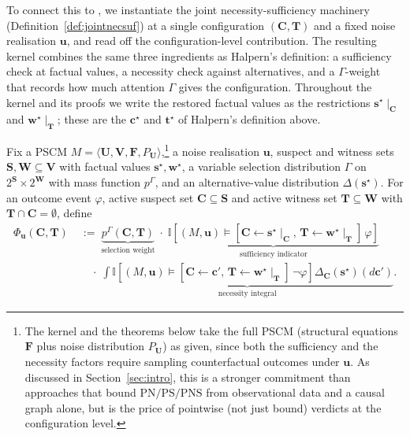 \noindent To connect this to \ourapproach{}, we instantiate the joint
necessity-sufficiency machinery (Definition~\ref{def:jointnecsuf}) at a single
configuration $(\mathbf{C}, \mathbf{T})$ and a fixed noise realisation $\mathbf{u}$,
and read off the configuration-level contribution. The resulting kernel combines the
same three ingredients as Halpern's definition: a sufficiency check at factual values,
a necessity check against alternatives, and a $\Gamma$-weight that records how much
attention $\Gamma$ gives the configuration. Throughout the kernel and its proofs we write
the restored factual values as the restrictions $\mathbf{s}^\star\!\mid_{\mathbf{C}}$
and $\mathbf{w}^\star\!\mid_{\mathbf{T}}$; these are the $\mathbf{c}^\star$ and
$\mathbf{t}^\star$ of Halpern's definition above.

\begin{definition} \label{def:ackernel}
Fix a PSCM $M=\langle\mathbf{U},\mathbf{V},\mathbf{F},P_{\mathbf{U}}\rangle$,\footnote{%
The kernel and the theorems below take the full PSCM (structural equations $\mathbf{F}$
plus noise distribution $P_{\mathbf{U}}$) as given, since both the sufficiency and the
necessity factors require sampling counterfactual outcomes under $\mathbf{u}$. As
discussed in Section~\ref{sec:intro}, this is a stronger commitment than approaches
that bound $\mathrm{PN}/\mathrm{PS}/\mathrm{PNS}$ from observational data and a causal
graph alone, but is the price of pointwise (not just bound) verdicts at the
configuration level.} a noise
realisation $\mathbf{u}$, suspect and witness sets $\mathbf{S},\mathbf{W}\subseteq\mathbf{V}$
with factual values $\mathbf{s}^\star,\mathbf{w}^\star$, a variable selection
distribution $\Gamma$ on $2^{\mathbf{S}}\times 2^{\mathbf{W}}$ with mass function
$p^\Gamma$, and an alternative-value distribution $\Delta(\mathbf{s}^\star)$. For an
outcome event $\varphi$, active suspect set $\mathbf{C}\subseteq\mathbf{S}$ and active
witness set $\mathbf{T}\subseteq\mathbf{W}$ with $\mathbf{T}\cap\mathbf{C}=\emptyset$,
define
\begin{align}
\Phi_{\mathbf{u}}(\mathbf{C},\mathbf{T})
&\;:=\;
\underbrace{p^\Gamma(\mathbf{C},\mathbf{T})}_\text{selection weight}
\;\cdot\;
\underbrace{\mathbb{I}\!\left[(M,\mathbf{u})\vDash
[\mathbf{C}\!\leftarrow\!\mathbf{s}^\star\!\mid_{\mathbf{C}},\,
 \mathbf{T}\!\leftarrow\!\mathbf{w}^\star\!\mid_{\mathbf{T}}]\,\varphi\right]}_\text{sufficiency indicator}
\nonumber \\
&\quad\;\cdot\;
\underbrace{\int
\mathbb{I}\!\left[(M,\mathbf{u})\vDash
[\mathbf{C}\!\leftarrow\!\mathbf{c}',\,
 \mathbf{T}\!\leftarrow\!\mathbf{w}^\star\!\mid_{\mathbf{T}}]\,\neg\varphi\right]
\Delta_{\mathbf{C}}(\mathbf{s}^\star)(d\mathbf{c}')}_\text{necessity integral}.
\label{eq:ackernel}
\end{align}
\end{definition}

